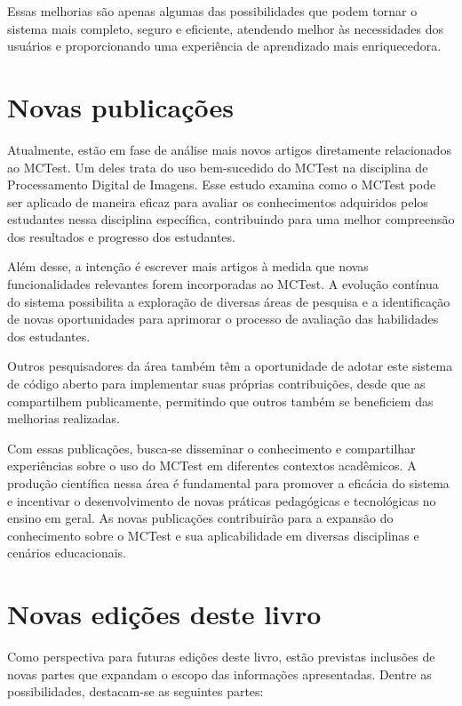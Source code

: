 Essas melhorias são apenas algumas das possibilidades que podem tornar o sistema mais completo, seguro e eficiente, atendendo melhor às necessidades dos usuários e proporcionando uma experiência de aprendizado mais enriquecedora.

\section{Novas publicações}

Atualmente, estão em fase de análise mais novos artigos diretamente relacionados ao MCTest. 
Um deles trata do uso bem-sucedido do MCTest na disciplina de Processamento Digital de Imagens. Esse estudo examina como o MCTest pode ser aplicado de maneira eficaz para avaliar os conhecimentos adquiridos pelos estudantes nessa disciplina específica, contribuindo para uma melhor compreensão dos resultados e progresso dos estudantes.

Além desse, a intenção é escrever mais artigos à medida que novas funcionalidades relevantes forem incorporadas ao MCTest. A evolução contínua do sistema possibilita a exploração de diversas áreas de pesquisa e a identificação de novas oportunidades para aprimorar o processo de avaliação das habilidades dos estudantes.

Outros pesquisadores da área também têm a oportunidade de adotar este sistema de código aberto para implementar suas próprias contribuições, desde que as compartilhem publicamente, permitindo que outros também se beneficiem das melhorias realizadas.


Com essas publicações, busca-se disseminar o conhecimento e compartilhar experiências sobre o uso do MCTest em diferentes contextos acadêmicos. A produção científica nessa área é fundamental para promover a eficácia do sistema e incentivar o desenvolvimento de novas práticas pedagógicas e tecnológicas no ensino em geral. As novas publicações contribuirão para a expansão do conhecimento sobre o MCTest e sua aplicabilidade em diversas disciplinas e cenários educacionais.

\section{Novas edições deste livro}

Como perspectiva para futuras edições deste livro, estão previstas inclusões de novas partes que expandam o escopo das informações apresentadas. Dentre as possibilidades, destacam-se as seguintes partes:

